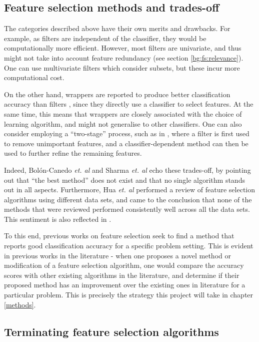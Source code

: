 \documentclass[12pt, twoside, a4paper]{report}
\begin{document}
\subsection{Feature selection methods and trades-off} \label{bg:fs:tradeoff}

The categories described above have their own merits and drawbacks. For example, as filters are independent of the classifier, they would be computationally more efficient. However, most filters are univariate, and thus might not take into account feature redundancy (see section \ref{bg:fs:relevance}). One can use multivariate filters which consider subsets, but these incur more computational cost.

On the other hand, wrappers are reported to produce better classification accuracy than filters \cite{RefWorks:163}, since they directly use a classifier to select features. At the same time, this means that wrappers are closely associated with the choice of learning algorithm, and might not generalise to other classifiers. One can also consider employing a ``two-stage'' process, such as in \cite{RefWorks:216}, where a filter is first used to remove unimportant features, and a classifier-dependent method can then be used to further refine the remaining features.

Indeed, Bolón-Canedo \textit{et. al} \cite{RefWorks:163} and Sharma \textit{et. al} \cite{RefWorks:215} echo these trades-off, by pointing out that ``the best method'' does not exist and that no single algorithm stands out in all aspects. Furthermore, Hua \textit{et. al} \cite{RefWorks:216} performed a review of feature selection algorithms using different data sets, and came to the conclusion that none of the methods that were reviewed performed consistently well across all the data sets. This sentiment is also reflected in \cite{RefWorks:217}.

To this end, previous works on feature selection seek to find a method that reports good classification accuracy for a specific problem setting. This is evident in previous works in the literature - when one proposes a novel method or modification of a feature selection algorithm, one would compare the accuracy scores with other existing algorithms in the literature, and determine if their proposed method has an improvement over the existing ones in literature for a particular problem. This is precisely the strategy this project will take in chapter \ref{methods}.

\subsection{Terminating feature selection algorithms} \label{bg:fs:terminating}
\end{document}
